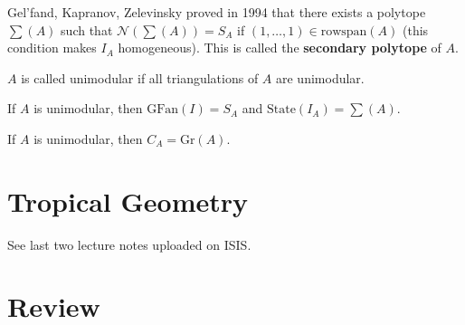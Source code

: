 \documentclass[a4paper, 11pt]{article}
\begin{document}
\begin{remark}
  Gel'fand, Kapranov,  Zelevinsky proved in 1994 that there exists a polytope \( \sum(A) \) such that \( \mathcal{N}(\sum(A)) = S_A \) if \( (1, \dots, 1) \in \mathrm{rowspan}(A) \) (this condition makes \( I_A \) homogeneous). This is called the \textbf{secondary polytope} of \( A \).
\end{remark}

\begin{remark}
  \( A \) is called unimodular if all triangulations of \( A \) are unimodular.

  If \( A \) is unimodular, then \( \mathrm{GFan}(I) = S_A \) and \( \mathrm{State}(I_A) = \sum(A) \).

  If \( A \) is unimodular, then \( C_A = \mathrm{Gr}(A) \).
\end{remark}

\clearpage
\section{Tropical Geometry}
See last two lecture notes uploaded on ISIS.


\clearpage
\section{Review}
\end{document}
